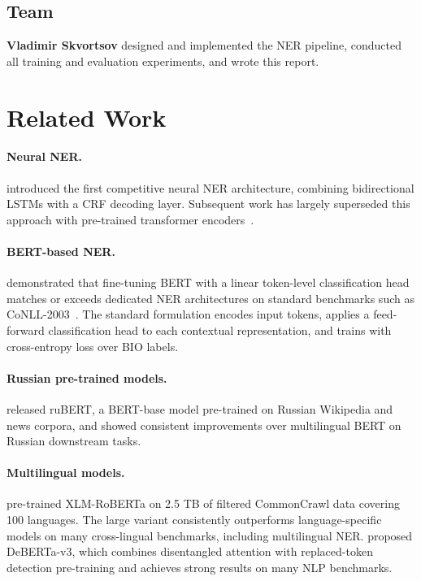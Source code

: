 \documentclass{article}
\begin{document}
\subsection{Team}

\textbf{Vladimir Skvortsov} designed and implemented the NER pipeline,
conducted all training and evaluation experiments, and wrote this report.

\section{Related Work}
\label{sec:related}

\paragraph{Neural NER.}
\citet{lample2016neural} introduced the first competitive neural NER architecture,
combining bidirectional LSTMs with a CRF decoding layer.
Subsequent work has largely superseded this approach with pre-trained transformer
encoders~\cite{devlin2019bert}.

\paragraph{BERT-based NER.}
\citet{devlin2019bert} demonstrated that fine-tuning BERT with a linear
token-level classification head matches or exceeds dedicated NER architectures
on standard benchmarks such as CoNLL-2003~\cite{sang2003conll}.
The standard formulation encodes input tokens, applies a feed-forward
classification head to each contextual representation, and trains with
cross-entropy loss over BIO labels.

\paragraph{Russian pre-trained models.}
\citet{kuratov2019rubert} released ruBERT, a BERT-base model pre-trained on
Russian Wikipedia and news corpora, and showed consistent improvements over
multilingual BERT on Russian downstream tasks.

\paragraph{Multilingual models.}
\citet{conneau2020xlmr} pre-trained XLM-RoBERTa on 2.5 TB of filtered
CommonCrawl data covering 100 languages.
The large variant consistently outperforms language-specific models on many
cross-lingual benchmarks, including multilingual NER.
\citet{he2023debertav3} proposed DeBERTa-v3, which combines disentangled
attention with replaced-token detection pre-training and achieves strong
results on many NLP benchmarks.
\end{document}
